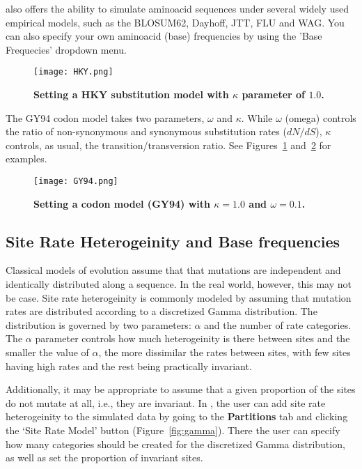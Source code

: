 {\bussname} also offers the ability to simulate aminoacid sequences under several widely used empirical models, such as the BLOSUM62, Dayhoff, JTT, FLU and WAG. You can also specify your own aminoacid (base) frequencies by using the 'Base Frequecies' dropdown menu.  

\begin{figure}[h!]
\centering
\texttt{[image: HKY.png]} 
\caption{
{ \footnotesize 
{\bf Setting a HKY substitution model with $\kappa$ parameter of $1.0$.}
} %
}
\label{fig:hky}
\end{figure}

The GY94 codon model takes two parameters, $\omega$ and $\kappa$. 
While $\omega$ (omega) controls the ratio of non-synonymous and synonymous substitution rates ($dN/dS$), $\kappa$ controls, as usual, the transition/transversion ratio. 
See Figures~\ref{fig:hky} and~\ref{fig:gy94} for examples.

\begin{figure}[h!]
\centering
\texttt{[image: GY94.png]} 
\caption{
{ \footnotesize 
{\bf Setting a codon model (GY94) with $\kappa=1.0$ and $\omega=0.1$.}
} %
}
\label{fig:gy94}
\end{figure}

\subsection{Site Rate Heterogeinity and Base frequencies}

Classical models of evolution assume that that mutations are independent and identically distributed along a sequence. 
In the real world, however, this may not be case. 
Site rate heterogeinity is commonly modeled by assuming that mutation rates are distributed according to a discretized Gamma distribution.
The distribution is governed by two parameters: $\alpha$ and the number of rate categories. 
The $\alpha$ parameter controls how much heterogeinity is there between sites and the smaller the value of $\alpha$, the more dissimilar the rates between sites, with few sites having high rates and the rest being practically invariant.

Additionally, it may be appropriate to assume that a given proportion of the sites do not mutate at all, i.e., they are invariant. 
In {\bussname}, the user can add site rate heterogeinity to the simulated data by going to the \textbf{Partitions} tab and clicking the `Site Rate Model' button (Figure~\ref{fig:gamma}). 
There the user can specify how many categories should be created for the discretized Gamma distribution, as well as set the proportion of invariant sites.

